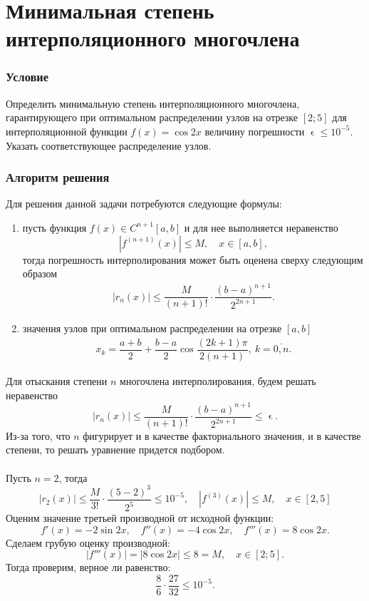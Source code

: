 \documentclass[a4paper, 12pt]{article}
\renewcommand{\leq}{\leqslant}
\renewcommand{\epsilon}{\upvarepsilon}
\begin{document}
	\section*{Минимальная степень интерполяционного многочлена}
	\subsubsection*{Условие}
	Определить минимальную степень интерполяционного многочлена, гарантирующего при оптимальном распределении узлов на отрезке $[2;5]$ для интерполяционной функции $f(x) = \cos 2x$ величину погрешности $\epsilon \leq 10^{-5}$. Указать соответствующее распределение узлов.
	\subsubsection*{Алгоритм решения}
	Для решения данной задачи потребуются следующие формулы:
	\begin{enumerate}
		\item пусть функция $f(x)\in C^{n+1}[a,b]$ и для нее выполняется неравенство $$|f^{(n+1)}(x)|\leq M, \quad x\in [a,b],$$
		тогда погрешность интерполирования может быть оценена сверху следующим образом
		\begin{eqnarray}
			|r_n(x)| \leq \dfrac{M}{(n+1)!}\cdot \dfrac{(b-a)^{n+1}}{2^{2n+1}}.
		\end{eqnarray}
		\item значения узлов при оптимальном распределении на отрезке $[a,b]$
		\begin{eqnarray}
			x_k = \dfrac{a+b}{2} + \dfrac{b-a}{2}\cos \dfrac{(2k+1)\pi}{2(n+1)},\ k=\overline{0,n}.
		\end{eqnarray}
	\end{enumerate}
	Для отыскания степени $n$ многочлена интерполирования, будем решать неравенство $$|r_n(x)| \leq \dfrac{M}{(n+1)!}\cdot \dfrac{(b-a)^{n+1}}{2^{2n+1}}\leq \epsilon.$$
	Из-за того, что $n$ фигурирует и в качестве факториального значения, и в качестве степени, то решать уравнение придется подбором.\\\\
	Пусть $n=2$, тогда 
	$$|r_2(x)| \leq \dfrac{M}{3!}\cdot \dfrac{(5-2)^{3}}{2^{5}}\leq 10^{-5},\quad |f^{(3)}(x)|\leq M,\quad x\in [2,5]$$
	Оценим значение третьей производной от исходной функции:
	$$f'(x) = -2\sin 2x,\quad f''(x) =-4\cos2x ,\quad f'''(x) = 8\cos2x.$$
	Сделаем грубую оценку производной: $$|f'''(x)| = |8\cos2x| \leq 8 = M,\quad x\in [2;5].$$
	Тогда проверим, верное ли равенство:
	$$\dfrac{8}{6}\cdot \dfrac{27}{32}\leq 10^{-5}.$$
\end{document}
